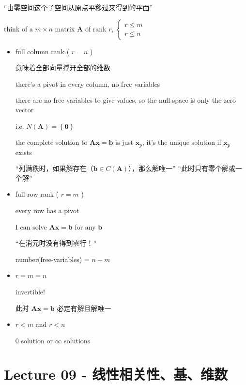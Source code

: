 \documentclass[12pt, a4paper]{article}
\begin{document}
{\begin{center}
	\newline
	{\textcolor{anhao-scarlet}{“由零空间这个子空间从原点平移过来得到的平面”}}
\end{center}
\vspace{31pt}
think of a $m \times n$ matrix ${\mathbf{A}}$ of rank $r$, 
\begin{math}
	\left\{
		\begin{array}{rcl}
			r \leq m \\
			r \leq n 
		\end{array}
	\right.
\end{math}
\newline
\begin{itemize}
	\item full column rank ( $r=n$ )
	\par 意味着全部向量撑开全部的维数
	\par there's a pivot in every column, no free variables
	\par there are no free variables to give values, so the null space is only the zero vector
	\par i.e. $N({\mathbf{A}})=\left\{{\mathbf{0}}\right\}$
	\par the complete solution to ${\mathbf{A}}{\mathbf{x}} = {\mathbf{b}}$ is just ${\mathbf{x}}_p$, it's the unique solution if ${\mathbf{x}}_p$ exists
	\par “列满秩时，如果解存在（${\mathbf{b}} \in C({\mathbf{A}})$），那么解唯一” “此时只有零个解或一个解”
	\item full row rank ( $r=m$ )
	\par every row has a pivot
	\par I can solve ${\mathbf{A}}{\mathbf{x}} = {\mathbf{b}}$ for any ${\mathbf{b}}$
	\par “在消元时没有得到零行！”
	\par number(free-variables) = $n-m$
	\item $r=m=n$ 
	\par invertible!
	\par 此时 ${\mathbf{A}}{\mathbf{x}} = {\mathbf{b}}$ 必定有解且解唯一
	\item $r<m$ and $r<n$
	\par 0 solution or $\infty$ solutions
\end{itemize}

\newpage
\section{Lecture 09 - 线性相关性、基、维数}
\pagestyle{fancy}
\lhead{}
\rhead{}

}
\end{document}
